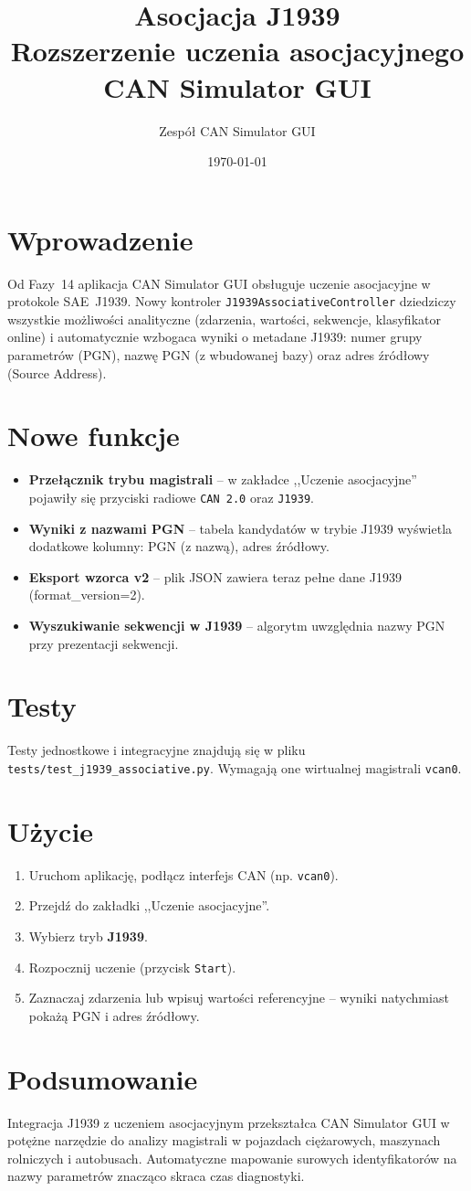 \documentclass[a4paper,12pt]{article}
\title{Asocjacja J1939\\Rozszerzenie uczenia asocjacyjnego CAN Simulator GUI}
\author{Zespół CAN Simulator GUI}
\date{\today}
\begin{document}
\maketitle
\tableofcontents

\section{Wprowadzenie}
Od Fazy~14 aplikacja CAN Simulator GUI obsługuje uczenie asocjacyjne w protokole SAE~J1939. Nowy kontroler \texttt{J1939AssociativeController} dziedziczy wszystkie możliwości analityczne (zdarzenia, wartości, sekwencje, klasyfikator online) i automatycznie wzbogaca wyniki o metadane J1939: numer grupy parametrów (PGN), nazwę PGN (z wbudowanej bazy) oraz adres źródłowy (Source Address).

\section{Nowe funkcje}
\begin{itemize}
    \item \textbf{Przełącznik trybu magistrali} – w zakładce ,,Uczenie asocjacyjne'' pojawiły się przyciski radiowe \texttt{CAN 2.0} oraz \texttt{J1939}.
    \item \textbf{Wyniki z nazwami PGN} – tabela kandydatów w trybie J1939 wyświetla dodatkowe kolumny: PGN (z nazwą), adres źródłowy.
    \item \textbf{Eksport wzorca v2} – plik JSON zawiera teraz pełne dane J1939 (format\_version=2).
    \item \textbf{Wyszukiwanie sekwencji w J1939} – algorytm uwzględnia nazwy PGN przy prezentacji sekwencji.
\end{itemize}

\section{Testy}
Testy jednostkowe i integracyjne znajdują się w pliku \texttt{tests/test\_j1939\_associative.py}. Wymagają one wirtualnej magistrali \texttt{vcan0}.

\section{Użycie}
\begin{enumerate}
    \item Uruchom aplikację, podłącz interfejs CAN (np. \texttt{vcan0}).
    \item Przejdź do zakładki ,,Uczenie asocjacyjne''.
    \item Wybierz tryb \textbf{J1939}.
    \item Rozpocznij uczenie (przycisk \texttt{Start}).
    \item Zaznaczaj zdarzenia lub wpisuj wartości referencyjne – wyniki natychmiast pokażą PGN i adres źródłowy.
\end{enumerate}

\section{Podsumowanie}
Integracja J1939 z uczeniem asocjacyjnym przekształca CAN Simulator GUI w potężne narzędzie do analizy magistrali w pojazdach ciężarowych, maszynach rolniczych i autobusach. Automatyczne mapowanie surowych identyfikatorów na nazwy parametrów znacząco skraca czas diagnostyki.
\end{document}
